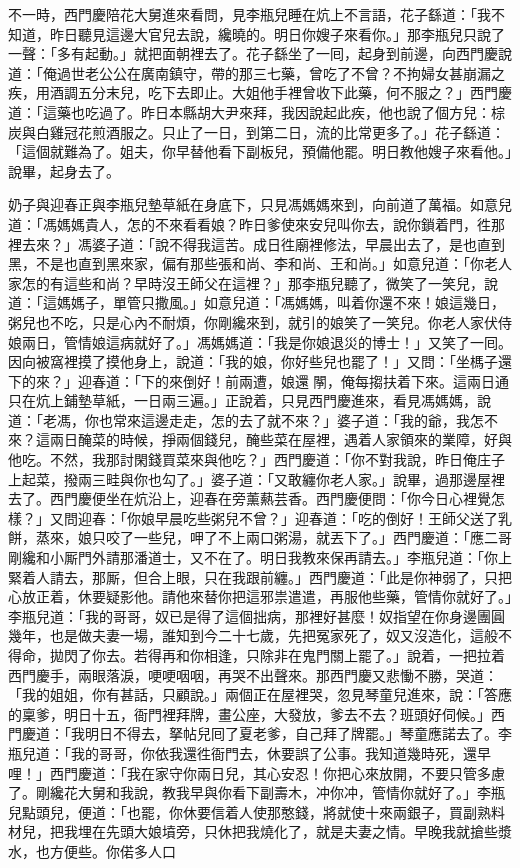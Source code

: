 不一時，西門慶陪花大舅進來看問，見李瓶兒睡在炕上不言語，花子繇道：「我不知道，昨日聽見這邊大官兒去說，纔曉的。明日你嫂子來看你。」那李瓶兒只說了一聲：「多有起動。」{}就把面朝裡去了。花子繇坐了一囘，起身到前邊，向西門慶說道：「俺過世老公公在廣南鎮守，帶的那三七藥，曾吃了不曾？不拘婦女甚崩漏之疾，用酒調五分末兒，吃下去即止。大姐他手裡曾收下此藥，何不服之？」西門慶道：「這藥也吃過了。昨日本縣胡大尹來拜，我因說起此疾，他也說了個方兒：棕炭與白雞冠花煎酒服之。只止了一日，到第二日，流的比常更多了。」花子繇道：「這個就難為了。姐夫，你早替他看下副板兒，預備他罷。明日教他嫂子來看他。」說畢，起身去了。

奶子與迎春正與李瓶兒墊草紙在身底下，只見馮媽媽來到，向前道了萬福。如意兒道：「馮媽媽貴人，怎的不來看看娘？昨日爹使來安兒叫你去，說你鎖着門，徃那裡去來？」馮婆子道：「說不得我這苦。成日徃廟裡修法，早晨出去了，是也直到黑，不是也直到黑來家，偏有那些張和尚、李和尚、王和尚。」{}如意兒道：「你老人家怎的有這些和尚？早時沒王師父在這裡？」那李瓶兒聽了，微笑了一笑兒，說道：「這媽媽子，單管只撒風。」如意兒道：「馮媽媽，叫着你還不來！娘這幾日，粥兒也不吃，只是心內不耐煩，你剛纔來到，就引的娘笑了一笑兒。你老人家伏侍娘兩日，管情娘這病就好了。」馮媽媽道：「我是你娘退災的博士！」又笑了一囘。因向被窩裡摸了摸他身上，說道：「我的娘，你好些兒也罷了！」又問：「坐榪子還下的來？」迎春道：「下的來倒好！前兩遭，娘還𨴃䦛，俺每搊扶着下來。這兩日通只在炕上鋪墊草紙，一日兩三遍。」正說着，只見西門慶進來，看見馮媽媽，說道：「老馮，你也常來這邊走走，怎的去了就不來？」婆子道：「我的爺，我怎不來？這兩日醃菜的時候，掙兩個錢兒，醃些菜在屋裡，遇着人家領來的業障，好與他吃。不然，我那討閑錢買菜來與他吃？」{}西門慶道：「你不對我說，昨日俺庄子上起菜，撥兩三畦與你也勾了。」婆子道：「又敢纏你老人家。」說畢，過那邊屋裡去了。西門慶便坐在炕沿上，迎春在旁薰爇芸香。西門慶便問：「你今日心裡覺怎樣？」又問迎春：「你娘早晨吃些粥兒不曾？」迎春道：「吃的倒好！王師父送了乳餅，蒸來，娘只咬了一些兒，呷了不上兩口粥湯，就丟下了。」西門慶道：「應二哥剛纔和小厮門外請那潘道士，又不在了。明日我教來保再請去。」李瓶兒道：「你上緊着人請去，那厮，但合上眼，只在我跟前纏。」西門慶道：「此是你神弱了，只把心放正着，休要疑影他。請他來替你把這邪祟遣遣，再服他些藥，管情你就好了。」李瓶兒道：「我的哥哥，奴已是得了這個拙病，那裡好甚麼！奴指望在你身邊團圓幾年，也是做夫妻一場，誰知到今二十七歲，先把冤家死了，奴又沒造化，這般不得命，拋閃了你去。若得再和你相逢，只除非在鬼門關上罷了。」說着，一把拉着西門慶手，兩眼落淚，哽哽咽咽，再哭不出聲來。那西門慶又悲慟不勝，哭道：「我的姐姐，你有甚話，只顧說。」兩個正在屋裡哭，忽見琴童兒進來，說：「答應的稟爹，明日十五，衙門裡拜牌，畫公座，大發放，爹去不去？班頭好伺候。」西門慶道：「我明日不得去，拏帖兒囘了夏老爹，自己拜了牌罷。」琴童應諾去了。李瓶兒道：「我的哥哥，你依我還徃衙門去，休要誤了公事。我知道幾時死，還早哩！」西門慶道：「我在家守你兩日兒，其心安忍！你把心來放開，不要只管多慮了。剛纔花大舅和我說，教我早與你看下副壽木，冲你冲，管情你就好了。」李瓶兒點頭兒，便道：「也罷，你休要信着人使那憨錢，將就使十來兩銀子，買副熟料材兒，把我埋在先頭大娘墳旁，只休把我燒化了，就是夫妻之情。早晚我就搶些漿水，也方便些。你偌多人口